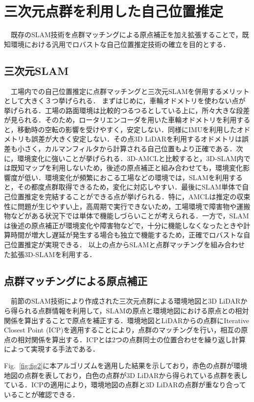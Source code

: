 \section{三次元点群を利用した自己位置推定}
\label{sec:self_position}
　既存のSLAM技術\cite{6DSLAM_outside, 3D_SLAM_outside, EKF_SLAM, FAST-LIO, FAST-LIO2}を点群マッチングによる原点補正を加え拡張することで，既知環境における汎用でロバストな自己位置推定技術の確立を目的とする．

\subsection{三次元SLAM}
　工場内での自己位置推定に点群マッチングと三次元SLAMを併用するメリットとして大きく３つ挙げられる．
まずはじめに，車輪オドメトリを使わない点が挙げられる．工場の路面環境は比較的つるつるとしている上に，所々大きな段差が見られる．そのため，ロータリエンコーダを用いた車輪オドメトリを利用すると，移動時の空転の影響を受けやすく，安定しない．同様にIMUを利用したオドメトリも誤差が大きく安定しない．その点3D LiDARを利用するオドメトリは誤差も小さく，カルマンフィルタから計算される自己位置もより正確である．次に，環境変化に強いことが挙げられる．3D-AMCL\cite{3d-AMCL}と比較すると，3D-SLAM内では既知マップを利用しないため，後述の原点補正と組み合わせても，環境変化影響度が低い．環境変化が頻繁におこる工場などの環境では，SLAMを利用すると，その都度点群取得できるため，変化に対応しやすい．最後にSLAM単体で自己位置推定を完結することができる点が挙げられる．特に，AMCLは推定の収束性に問題が生じやすい上，高周期で実行できないため，工場環境で障害物や運搬物などがある状況下では単体で機能しづらいことが考えられる．一方で，SLAMは後述の原点補正が環境変化や障害物などで，十分に機能しなくなったときや計算時間が増大し遅延が発生する場合も独立で機能するため，正確でロバストな自己位置推定が実現できる．
以上の点からSLAMと点群マッチングを組み合わせた拡張3D-SLAMを利用する．

\subsection{点群マッチングによる原点補正}
　前節のSLAM技術により作成された三次元点群による環境地図と3D LiDARから得られる点群情報を利用して，SLAMの原点と環境地図における原点との相対関係を算出することで原点を補正する．環境地図とLiDARからの点群にIterative Closest Point (ICP)\cite{ICP}を適用することにより，点群のマッチングを行い，相互の原点の相対関係を算出する．ICPとは2つの点群同士の位置合わせを繰り返し計算によって実現する手法である．

Fig.~\ref{fig:fig2}に本アルゴリズムを適用した結果を示しており，赤色の点群が環境地図の点群を表しており，白色の点群が3D LiDARから得られている点群を表している．ICPの適用により，環境地図の点群と3D LiDARの点群が重なり合っていることが確認できる．

